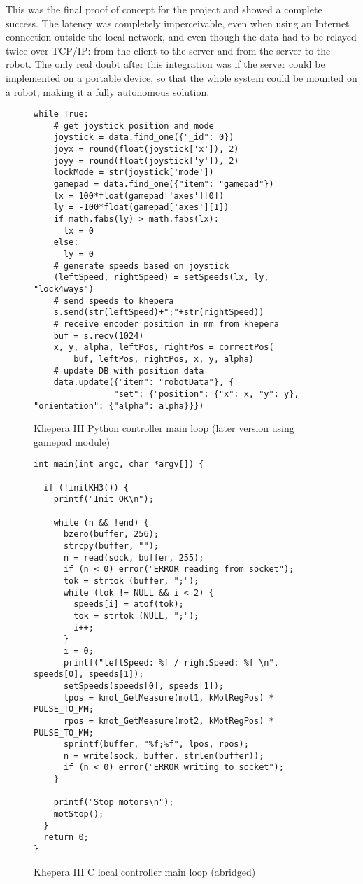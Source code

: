 This was the final proof of concept for the project and showed a complete success. The latency was completely imperceivable, even when
using an Internet connection outside the local network, and even though the data had to be relayed twice over TCP/IP: from the client to
the server and from the server to the robot. The only real doubt after this integration was if the server could be implemented on a
portable device, so that the whole system could be mounted on a robot, making it a fully autonomous solution.
  \begin{figure}[H]  
  \captionsetup{justification=centering}
  \begin{verbatim}
while True:
    # get joystick position and mode
    joystick = data.find_one({"_id": 0})
    joyx = round(float(joystick['x']), 2)
    joyy = round(float(joystick['y']), 2)
    lockMode = str(joystick['mode'])
    gamepad = data.find_one({"item": "gamepad"})
    lx = 100*float(gamepad['axes'][0])
    ly = -100*float(gamepad['axes'][1])
    if math.fabs(ly) > math.fabs(lx):
      lx = 0
    else:
      ly = 0
    # generate speeds based on joystick
    (leftSpeed, rightSpeed) = setSpeeds(lx, ly, "lock4ways")
    # send speeds to khepera
    s.send(str(leftSpeed)+";"+str(rightSpeed))
    # receive encoder position in mm from khepera
    buf = s.recv(1024)
    x, y, alpha, leftPos, rightPos = correctPos(
        buf, leftPos, rightPos, x, y, alpha)
    # update DB with position data
    data.update({"item": "robotData"}, {
                "set": {"position": {"x": x, "y": y}, "orientation": {"alpha": alpha}}})  
  \end{verbatim}
  \caption{Khepera III Python controller main loop (later version using gamepad module)\label{kheperapython}}
  \end{figure}
  \begin{figure}[H]  
  \captionsetup{justification=centering}
  \begin{verbatim}
int main(int argc, char *argv[]) {

  if (!initKH3()) {
    printf("Init OK\n");

    while (n && !end) {
      bzero(buffer, 256);
      strcpy(buffer, "");
      n = read(sock, buffer, 255);
      if (n < 0) error("ERROR reading from socket");
      tok = strtok (buffer, ";");
      while (tok != NULL && i < 2) {
        speeds[i] = atof(tok);
        tok = strtok (NULL, ";");
        i++;
      }
      i = 0;
      printf("leftSpeed: %f / rightSpeed: %f \n", speeds[0], speeds[1]);
      setSpeeds(speeds[0], speeds[1]);
      lpos = kmot_GetMeasure(mot1, kMotRegPos) * PULSE_TO_MM;
      rpos = kmot_GetMeasure(mot2, kMotRegPos) * PULSE_TO_MM;
      sprintf(buffer, "%f;%f", lpos, rpos);
      n = write(sock, buffer, strlen(buffer));
      if (n < 0) error("ERROR writing to socket");
    }

    printf("Stop motors\n");
    motStop();
  }
  return 0;
}
  \end{verbatim}
  \caption{Khepera III C local controller main loop (abridged)\label{kheperac}}
  \end{figure}
